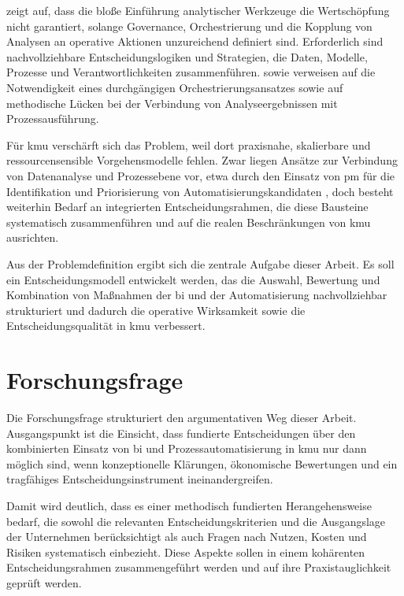 \textcite{Seufert:2016} zeigt auf, dass die bloße Einführung analytischer Werkzeuge die Wertschöpfung nicht garantiert, solange Governance, Orchestrierung und die Kopplung von Analysen an operative Aktionen unzureichend definiert sind. \cite{Seufert:2016} Erforderlich sind nachvollziehbare Entscheidungslogiken und Strategien, die Daten, Modelle, Prozesse und Verantwortlichkeiten zusammenführen. \cite{BrethenouxEtAl:2024} \textcite{NohrLehmannKnaup:2009} sowie \textcite{Juhrisch:2010} verweisen auf die Notwendigkeit eines durchgängigen Orchestrierungsansatzes sowie auf methodische Lücken bei der Verbindung von Analyseergebnissen mit Prozessausführung. \cite{NohrLehmannKnaup:2009,Juhrisch:2010} 

Für \gls{kmu} verschärft sich das Problem, weil dort praxisnahe, skalierbare und ressourcensensible Vorgehensmodelle fehlen. \cite{Frank:2020} Zwar liegen Ansätze zur Verbindung von Datenanalyse und Prozessebene vor, etwa durch den Einsatz von \gls{pm} für die Identifikation und Priorisierung von Automatisierungskandidaten \cite{vanDerAalst:2016}, doch besteht weiterhin Bedarf an integrierten Entscheidungsrahmen, die diese Bausteine systematisch zusammenführen und auf die realen Beschränkungen von \gls{kmu} ausrichten. \cite{Frank:2020}

Aus der Problemdefinition ergibt sich die zentrale Aufgabe dieser Arbeit. Es soll ein Entscheidungsmodell entwickelt werden, das die Auswahl, Bewertung und Kombination von Maßnahmen der \gls{bi} und der Automatisierung nachvollziehbar strukturiert und dadurch die operative Wirksamkeit sowie die Entscheidungsqualität in \gls{kmu} verbessert.


\section{Forschungsfrage}\label{sec:forschungsfrage}

Die Forschungsfrage strukturiert den argumentativen Weg dieser Arbeit. Ausgangspunkt ist die Einsicht, dass fundierte Entscheidungen über den kombinierten Einsatz von \gls{bi} und Prozessautomatisierung in \gls{kmu} nur dann möglich sind, wenn konzeptionelle Klärungen, ökonomische Bewertungen und ein tragfähiges Entscheidungsinstrument ineinandergreifen. 

Damit wird deutlich, dass es einer methodisch fundierten Herangehensweise bedarf, die sowohl die relevanten Entscheidungskriterien und die Ausgangslage der Unternehmen berücksichtigt als auch Fragen nach Nutzen, Kosten und Risiken systematisch einbezieht. Diese Aspekte sollen in einem kohärenten Entscheidungsrahmen zusammengeführt werden und auf ihre Praxistauglichkeit geprüft werden.

